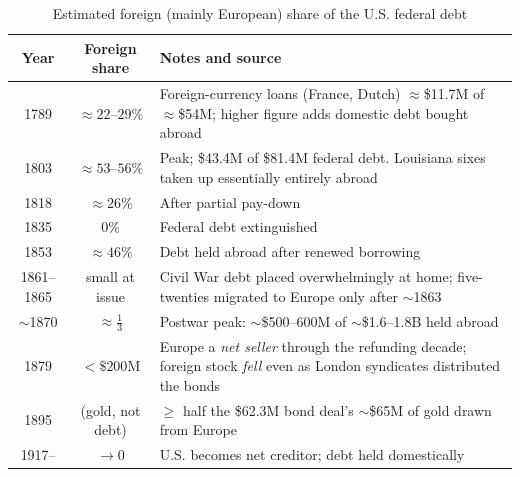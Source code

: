 \documentclass[12pt]{article}
\begin{document}
\begin{table}[htbp]
\centering
\caption{Estimated foreign (mainly European) share of the U.S. federal debt}
\label{tab:foreign}
\small
\begin{tabular}{c c p{7.5cm}}
\toprule
Year & Foreign share & Notes and source \\
\midrule
1789 & $\approx 22$--$29\%$ & Foreign-currency loans (France, Dutch) $\approx$\$11.7M of $\approx$\$54M; higher figure adds domestic debt bought abroad \citep{wilkins1989history, bayley1881national} \\
1803 & $\approx 53$--$56\%$ & Peak; \$43.4M of \$81.4M federal debt. Louisiana sixes taken up essentially entirely abroad \citep{syllawilsonwright2006, wilkins1989history} \\
1818 & $\approx 26\%$ & After partial pay-down \citep{wilkins1989history} \\
1835 & $0\%$ & Federal debt extinguished \citep{lane2014nation} \\
1853 & $\approx 46\%$ & Debt held abroad after renewed borrowing \citep{wilkins1989history} \\
1861--1865 & small at issue & Civil War debt placed overwhelmingly at home; five-twenties migrated to Europe only after $\sim$1863 \citep{sexton2005debtor} \\
$\sim$1870 & $\approx \tfrac{1}{3}$ & Postwar peak: $\sim$\$500--600M of $\sim$\$1.6--1.8B held abroad \citep{morgan1885, dewey1903financial} \\
1879 & $< \$200$M & Europe a \emph{net seller} through the refunding decade; foreign stock \emph{fell} even as London syndicates distributed the bonds \citep{dewey1903financial} \\
1895 & (gold, not debt) & $\geq$ half the \$62.3M bond deal's $\sim$\$65M of gold drawn from Europe \citep{cleveland1895message, chernow1990house} \\
1917-- & $\to 0$ & U.S. becomes net creditor; debt held domestically \citep{gilbert1970american} \\
\bottomrule
\end{tabular}
\end{table}
\end{document}
